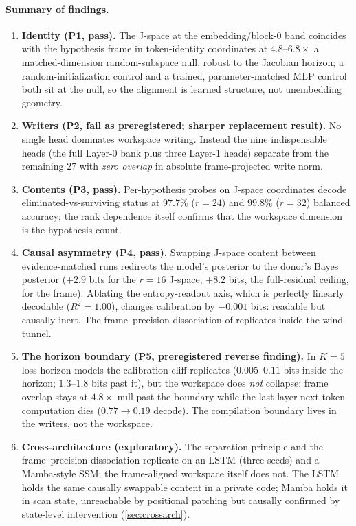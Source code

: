 \documentclass[11pt]{article}
\newcommand{\Jspace}{J\mbox{-}space}
\begin{document}
\paragraph{Summary of findings.}
\begin{enumerate}
  \item \textbf{Identity (P1, pass).} The \Jspace{} at the
  embedding/block-0 band coincides with the hypothesis frame in
  token-identity coordinates at $4.8$--$6.8\times$ a matched-dimension
  random-subspace null, robust to the Jacobian horizon; a
  random-initialization control and a trained, parameter-matched MLP
  control both sit at the null, so the alignment is learned structure,
  not unembedding geometry.
  \item \textbf{Writers (P2, fail as preregistered; sharper replacement
  result).} No single head dominates workspace writing. Instead the nine
  indispensable heads (the full Layer-0 bank plus three Layer-1 heads)
  separate from the remaining 27 with \emph{zero overlap} in absolute
  frame-projected write norm.
  \item \textbf{Contents (P3, pass).} Per-hypothesis probes on \Jspace{}
  coordinates decode eliminated-vs-surviving status at $97.7\%$
  ($r{=}24$) and $99.8\%$ ($r{=}32$) balanced accuracy; the rank
  dependence itself confirms that the workspace dimension is the
  hypothesis count.
  \item \textbf{Causal asymmetry (P4, pass).} Swapping \Jspace{} content
  between evidence-matched runs redirects the model's posterior to the
  donor's Bayes posterior ($+2.9$ bits for the $r{=}16$ \Jspace{};
  $+8.2$ bits, the full-residual ceiling, for the frame). Ablating the
  entropy-readout axis, which is perfectly linearly decodable
  ($R^2{=}1.00$), changes calibration by $-0.001$ bits: readable but
  causally inert. The frame--precision dissociation of
  \citet{agarwal2026unified} replicates inside the wind tunnel.
  \item \textbf{The horizon boundary (P5, preregistered reverse finding).}
  In $K{=}5$ loss-horizon models the calibration cliff replicates
  ($0.005$--$0.11$ bits inside the horizon; $1.3$--$1.8$ bits past it),
  but the workspace does \emph{not} collapse: frame overlap stays at
  $4.8\times$ null past the boundary while the last-layer next-token
  computation dies ($0.77 \to 0.19$ decode). The compilation boundary
  lives in the writers, not the workspace.
  \item \textbf{Cross-architecture (exploratory).} The separation
  principle and the frame--precision dissociation replicate on an LSTM
  (three seeds) and a Mamba-style SSM; the frame-aligned workspace
  itself does not. The LSTM holds the same causally swappable content
  in a private code; Mamba holds it in scan state, unreachable by
  positional patching but causally confirmed by state-level
  intervention (\cref{sec:crossarch}).
\end{enumerate}
\end{document}
